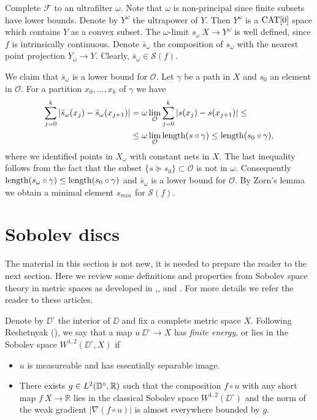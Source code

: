 \documentclass{article}
\begin{document}
Complete $\mathcal{F}$ to an ultrafilter $\omega$. Note that $\omega$ is non-principal since finite subsets have lower bounds.
Denote by $Y^\omega$ the ultrapower of $Y$. 
Then $Y^\omega$
is a $\mathop{\rm CAT}\nolimits[0]$ space which contains $Y$ as a convex subset. 
The $\omega$-limit $s_\omega\:X\to Y^\omega$ is well defined, since
$f$ is intrinsically continuous. 
Denote $\bar s_\omega$ the composition of $s_\omega$ with the nearest point projection $Y_\omega\to Y$.
Clearly, $\bar s_\omega\in \mathcal{S}(f)$.

We claim that $\bar s_\omega$
is a lower bound for $\mathcal{O}$. 
Let $\gamma$ be a path in $X$ and $s_0$ an element in $\mathcal{O}$. 
For a partition $x_0,\ldots,x_k$
of $\gamma$ we have
\begin{align*}
\sum_{j=0}^k|\bar s_\omega(x_j)-\bar s_\omega(x_{j+1})|&=\omega\lim_{\mathcal{O}}\sum_{j=0}^k|s(x_j)-s(x_{j+1})|\leq 
\\
&\leq \omega\lim_{\mathcal{O}}\mathop{\rm length}\nolimits(s\circ\gamma)\leq \mathop{\rm length}\nolimits(s_0\circ\gamma),
\end{align*}
where we identified points in $X_\omega$ with constant nets in $X$. The last inequality follows from the fact that the subset $\{s\succcurlyeq s_0\}\subset \mathcal{O}$
is not in $\omega$. Consequently $\mathop{\rm length}\nolimits(s_\omega\circ\gamma)\leq \mathop{\rm length}\nolimits(s_0\circ\gamma)$ and $\bar s_\omega$
is a lower bound for $\mathcal{O}$. By Zorn's lemma we obtain a minimal element $s_{min}$ for $\mathcal{S}(f)$.
\qeds





\section{Sobolev discs}

The material in this section is not new,
it is needed to prepare the reader to the next section.
Here we review some definitions and properties from Sobolev space theory in metric spaces as developed in 
\cite{KS},\cite{R}, \cite{HKST} and \cite{LW}. 
For more details we refer the reader to these articles.

Denote by  $\DD^\circ$ the interior of $\DD$ and fix a complete metric space $X$.
Following Reshetnyak (\cite{R}), we say that a map $u\:\DD^\circ\to X$ has {\em finite energy}, or lies in the Sobolev space $W^{1,2}(\DD^\circ,X)$ if
\begin{itemize}
 \item $u$ is measureable and has essentially separable image. %
 \item There exists $g\in L^2(\mathbb{D}^\circ,\mathbb{R})$ such that the composition $f\circ u$ with any short map $f\:X\to \mathbb{R}$ 
lies in the classical Sobolev space $W^{1,2}(\DD^\circ)$
 and the norm of the weak gradient $|\nabla(f\circ u)|$ is almost everywhere bounded by $g$.
\end{itemize}
\end{document}
